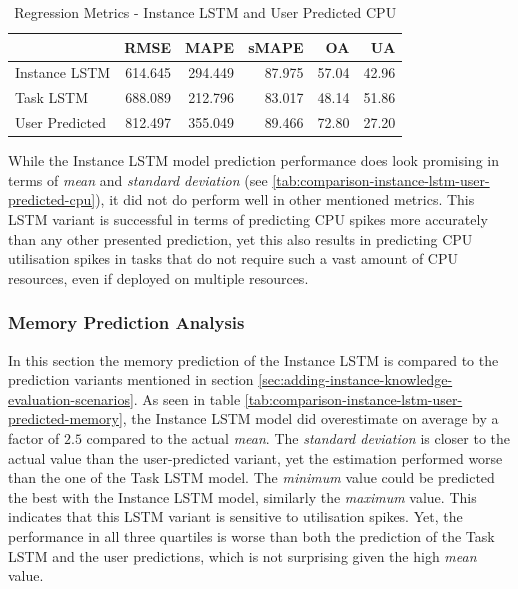       \begin{table}
        \centering
        \caption{Regression Metrics - Instance LSTM and User Predicted CPU}
        \label{tab:regression-metrics-instance-lstm-user-predicted-cpu}

        \begin{tabular}{|l|rrrrr|}
          \toprule
          {} &     RMSE &     MAPE &   sMAPE &     OA &     UA \\
          \midrule
          Instance LSTM   &  614.645 &  294.449 &  87.975 &  57.04 &  42.96 \\
          Task LSTM   &  688.089 &  212.796 &  83.017 &  48.14 &  51.86 \\
          User Predicted &  812.497 &  355.049 &  89.466 &  72.80 &  27.20 \\
          \bottomrule
        \end{tabular}
      \end{table}
      While the Instance LSTM model prediction performance does look promising in terms of \emph{mean} and \emph{standard deviation} (see \ref{tab:comparison-instance-lstm-user-predicted-cpu}), it did not do perform well in other mentioned metrics.
      This LSTM variant is successful in terms of predicting CPU spikes more accurately than any other presented prediction, yet this also results in predicting CPU utilisation spikes in tasks that do not require such a vast amount of CPU resources, even if deployed on multiple resources.

    \subsubsection{Memory Prediction Analysis}
    \label{sec:mem-prediction-analysis-instance-knowledge-lstm-evaluation-scenarios}

      In this section the memory prediction of the Instance LSTM is compared to the prediction variants mentioned in section \ref{sec:adding-instance-knowledge-evaluation-scenarios}.
      As seen in table \ref{tab:comparison-instance-lstm-user-predicted-memory}, the Instance LSTM model did overestimate on average by a factor of $2.5$ compared to the actual \emph{mean}.
      The \emph{standard deviation} is closer to the actual value than the user-predicted variant, yet the estimation performed worse than the one of the Task LSTM model.
      The \emph{minimum} value could be predicted the best with the Instance LSTM model, similarly the \emph{maximum} value. 
      This indicates that this LSTM variant is sensitive to utilisation spikes.
      Yet, the performance in all three quartiles is worse than both the prediction of the Task LSTM and the user predictions, which is not surprising given the high \emph{mean} value.

